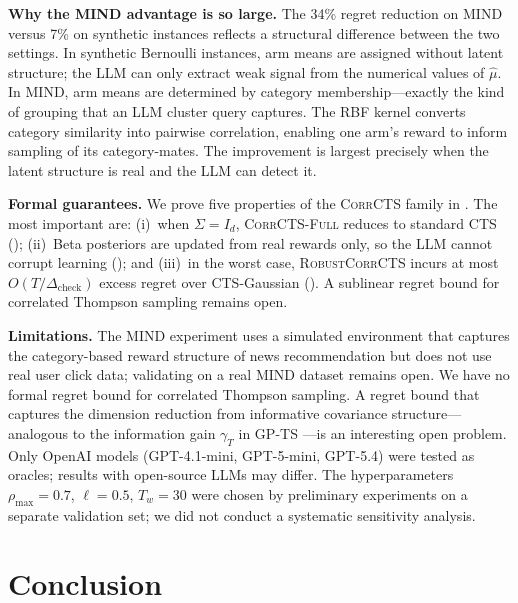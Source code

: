 \documentclass{article}
\theoremstyle{plain}
\theoremstyle{definition}
\theoremstyle{remark}
\newcommand{\CorrCTS}{\textsc{CorrCTS}}
\newcommand{\CorrFull}{\textsc{CorrCTS-Full}}
\newcommand{\RobustCorr}{\textsc{RobustCorrCTS}}
\begin{document}
\textbf{Why the MIND advantage is so large.}
The 34\% regret reduction on MIND versus 7\% on synthetic instances reflects a structural difference between the two settings.
In synthetic Bernoulli instances, arm means are assigned without latent structure; the LLM can only extract weak signal from the numerical values of $\hat\mu$.
In MIND, arm means are determined by category membership---exactly the kind of grouping that an LLM cluster query captures.
The RBF kernel converts category similarity into pairwise correlation, enabling one arm's reward to inform sampling of its category-mates.
The improvement is largest precisely when the latent structure is real and the LLM can detect it.

\textbf{Formal guarantees.}
We prove five properties of the \CorrCTS{} family in .
The most important are: (i)~when $\Sigma = I_d$, \CorrFull{} reduces to standard CTS (); (ii)~Beta posteriors are updated from real rewards only, so the LLM cannot corrupt learning (); and (iii)~in the worst case, \RobustCorr{} incurs at most $O(T/\Delta_{\mathrm{check}})$ excess regret over CTS-Gaussian ().
A sublinear regret bound for correlated Thompson sampling remains open.

\textbf{Limitations.}
The MIND experiment uses a simulated environment that captures the category-based reward structure of news recommendation but does not use real user click data; validating on a real MIND dataset remains open.
We have no formal regret bound for correlated Thompson sampling.
A regret bound that captures the dimension reduction from informative covariance structure---analogous to the information gain $\gamma_T$ in GP-TS \citep{srinivas2010gpucb}---is an interesting open problem.
Only OpenAI models (GPT-4.1-mini, GPT-5-mini, GPT-5.4) were tested as oracles; results with open-source LLMs may differ.
The hyperparameters $\rho_{\max} = 0.7$, $\ell = 0.5$, $T_w = 30$ were chosen by preliminary experiments on a separate validation set; we did not conduct a systematic sensitivity analysis.

\section{Conclusion}
\end{document}
